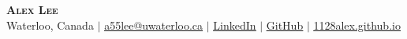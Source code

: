 \begin{center}
    \textbf{\Huge \scshape Alex Lee} \\ \vspace{1pt}
    {Waterloo, Canada} $|$ 
    \href{mailto:a55lee@uwaterloo.ca}{\underline{a55lee@uwaterloo.ca}} $|$ 
    \href{https://www.linkedin.com/in/alex-jiwon-lee/}{\underline{LinkedIn}} $|$
    \href{https://github.com/1128alex}{\underline{GitHub}} $|$ 
    \href{https://1128alex.github.io/alex-lee/}{\underline{1128alex.github.io}}
\end{center}
